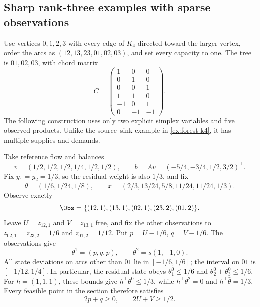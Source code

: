 \subsection{Sharp rank-three examples with sparse observations}\label{subsec:sharp-k4}
Use vertices $0,1,2,3$ with every edge of $K_4$ directed toward the larger
vertex, order the arcs as $(12,13,23,01,02,03)$, and set every capacity
to one. The tree is $01,02,03$, with chord matrix
\begin{equation}\label{eq:sharp-k4-matrix}
 C=\begin{pmatrix}
 1&0&0\\0&1&0\\0&0&1\\1&1&0\\-1&0&1\\0&-1&-1
 \end{pmatrix}.
\end{equation}
The following construction uses only two explicit simplex variables and
five observed products. Unlike the source--sink example in
\cref{ex:forest-k4}, it has multiple supplies and demands.

Take reference flow and balances
\begin{equation}\label{eq:sharp-k4-balances}
 v=(1/2,1/2,1/2,1/4,1/2,1/2),\qquad
 b=Av=(-5/4,-3/4,1/2,3/2)^\top.
\end{equation}
Fix $y_1=y_2=1/3$, so the residual weight is also $1/3$, and fix
\begin{equation}\label{eq:sharp-k4-aggregate}
 \bar\theta=(1/6,1/24,1/8),\qquad
 \bar x=(2/3,13/24,5/8,11/24,11/24,1/3).
\end{equation}
Observe exactly
\begin{equation}\label{eq:sharp-k4-observations}
 \Obs=\{(12,1),(13,1),(02,1),(23,2),(01,2)\}.
\end{equation}
Leave $U=z_{12,1}$ and $V=z_{13,1}$ free, and fix the other observations
to $z_{02,1}=z_{23,2}=1/6$ and $z_{01,2}=1/12$. Put
$p=U-1/6$, $q=V-1/6$. The observations give
\begin{equation}\label{eq:sharp-k4-states}
 \theta^1=(p,q,p),\qquad \theta^2=s(1,-1,0).
\end{equation}
All state deviations on arcs other than $01$ lie in $[-1/6,1/6]$;
the interval on $01$ is $[-1/12,1/4]$. In particular, the residual
state obeys $\theta^0_1\le1/6$ and
$\theta^0_2+\theta^0_3\le1/6$. For $h=(1,1,1)$, these bounds give
$h^\top\theta^0\le1/3$, while $h^\top\theta^2=0$ and
$h^\top\bar\theta=1/3$. Every feasible point in the section therefore
satisfies
\begin{equation}\label{eq:sharp-k4-cut}
                    2p+q\ge0,\qquad 2U+V\ge1/2.
\end{equation}

